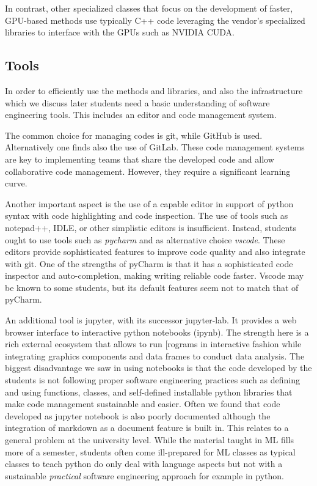 \documentclass[utf8]{FrontiersinVancouver} %
\begin{document}
In contrast, other specialized classes that focus on the development
of faster, GPU-based methods use typically C++ code leveraging the
vendor's specialized libraries to interface with the GPUs such as
NVIDIA CUDA.

\subsection{Tools}\label{sec:tools}

In order to efficiently use the methods and libraries, and also the
infrastructure which we discuss later students need a basic
understanding of software engineering tools. This includes an editor
and code management system.

The common choice for managing codes is git, while GitHub is
used. Alternatively one finds also the use of GitLab.  These code
management systems are key to implementing teams that share the
developed code and allow collaborative code management.  However, they
require a significant learning curve.

Another important aspect is the use of a capable editor in support of
python syntax with code highlighting and code inspection. The use of
tools such as notepad++, IDLE, or other simplistic editors is
insufficient. Instead, students ought to use tools such as {\em
  pycharm} and as alternative choice {\em vscode}. These editors
provide sophisticated features to improve code quality and also
integrate with git. One of the strengths of pyCharm is that it has a
sophisticated code inspector and auto-completion, making writing
reliable code faster. Vscode may be known to some students, but its
default features seem not to match that of pyCharm.

An additional tool is jupyter, with its successor jupyter-lab. It
provides a web browser interface to interactive python notebooks
(ipynb). The strength here is a rich external ecosystem that allows to
run [rograms in interactive fashion while integrating graphics
components and data frames to conduct data analysis.  The biggest
disadvantage we saw in using notebooks is that the code developed by
the students is not following proper software engineering practices
such as defining and using functions, classes, and self-defined
installable python libraries that make code management sustainable and
easier. Often we found that code developed as jupyter notebook is also
poorly documented although the integration of markdown as a document
feature is built in. This relates to a general problem at the
university level. While the material taught in ML fills more of a
semester, students often come ill-prepared for ML classes as typical
classes to teach python do only deal with language aspects but not
with a sustainable {\em practical} software engineering approach for
example in python.
\end{document}
